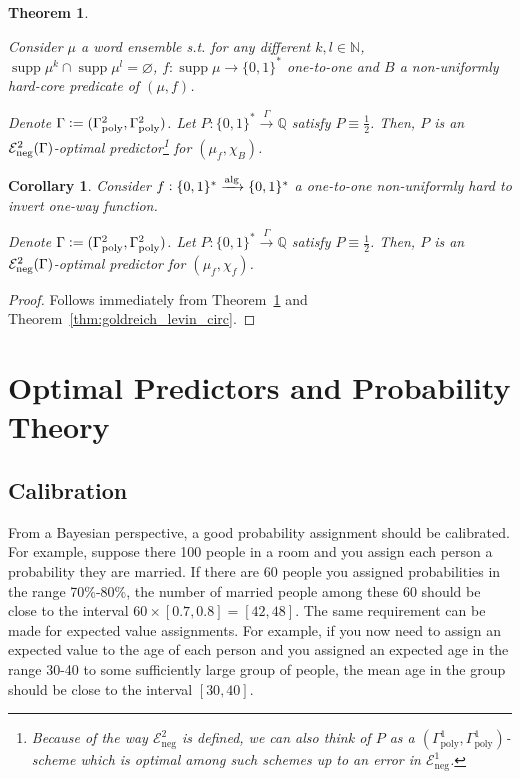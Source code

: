 \documentclass{article}
\numberwithin{equation}{section}
\theoremstyle{definition}
\theoremstyle{plain}
\newtheorem{theorem}{Theorem}[section]
\newtheorem{corollary}{Corollary}[section]
\newcommand{\Words}{{\{ 0, 1 \}^*}}
\DeclareMathOperator{\Supp}{supp}
\newcommand{\Nats}{\mathbb{N}}
\newcommand{\Rats}{\mathbb{Q}}
\newcommand{\Fall}{\mathcal{E}}
\newcommand{\Alg}{\xrightarrow{\textnormal{alg}}}
\newcommand{\Scheme}{\xrightarrow{\Gamma}}
\begin{document}
\begin{theorem}
\label{thm:hard_core_circ}

Consider $\mu$ a word ensemble s.t. for any different $k,l \in \Nats$, $\Supp \mu^k \cap \Supp \mu^l = \varnothing$, $f: \Supp \mu \rightarrow \Words$ one-to-one and $B$ a non-uniformly hard-core predicate of $(\mu,f)$. 

Denote $\Gamma:=(\Gamma_{\textnormal{poly}}^2,\Gamma_{\textnormal{poly}}^2)$. Let $P: \Words \Scheme \Rats$ satisfy $P \equiv \frac{1}{2}$. Then, $P$ is an $\Fall_{\textnormal{neg}}^2(\Gamma)$-optimal predictor\footnote{Because of the way $\Fall_{\text{neg}}^2$ is defined, we can also think of $P$ as a $(\Gamma_{\text{poly}}^1,\Gamma_{\text{poly}}^1)$-scheme which is optimal among such schemes up to an error in $\Fall_{\text{neg}}^1$.} for $(\mu_f, \chi_B)$.

\end{theorem}

\begin{corollary}

Consider $f: \Words \Alg \Words$ a one-to-one non-uniformly hard to invert one-way function.

Denote $\Gamma:=(\Gamma_{\textnormal{poly}}^2,\Gamma_{\textnormal{poly}}^2)$. Let $P: \Words \Scheme \Rats$ satisfy $P \equiv \frac{1}{2}$. Then, $P$ is an $\Fall_{\textnormal{neg}}^2(\Gamma)$-optimal predictor for $(\mu_f, \chi_f)$.

\end{corollary}

\begin{proof}

Follows immediately from Theorem~\ref{thm:hard_core_circ} and Theorem~\ref{thm:goldreich_levin_circ}.

\end{proof}

\section{Optimal Predictors and Probability Theory}
\label{sec:probability}

\subsection{Calibration}

From a Bayesian perspective, a good probability assignment should be calibrated. For example, suppose there 100 people in a room and you assign each person a probability they are married. If there are 60 people you assigned probabilities in the range 70\%-80\%, the number of married people among these 60 should be close to the interval $60 \times [0.7, 0.8] = [42,48]$. The same requirement can be made for expected value assignments. For example, if you now need to assign an expected value to the age of each person and you assigned an expected age in the range 30-40 to some sufficiently large group of people, the mean age in the group should be close to the interval $[30,40]$. 
\end{document}
